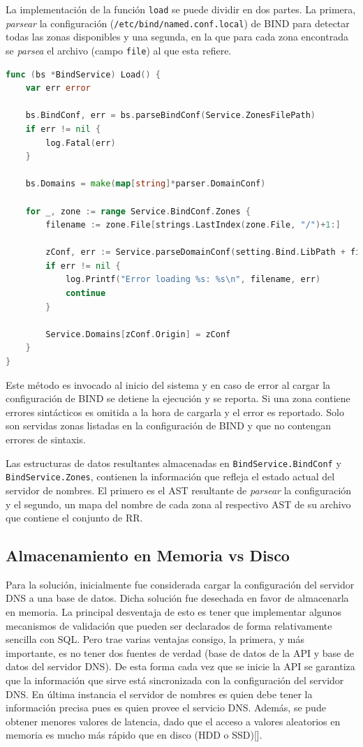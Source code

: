 La implementación de la función \verb|load| se puede dividir en dos partes. La primera, \textit{parsear} la configuración (\verb|/etc/bind/named.conf.local|) de BIND para detectar todas las zonas disponibles y una segunda, en la que para cada zona encontrada se \textit{parsea} el archivo (campo \verb|file|) al que esta refiere.

\begin{lstlisting}[frame=single, language=Go, caption=Implementación de la función \textbf{load} para BIND.]
func (bs *BindService) Load() {
	var err error

	bs.BindConf, err = bs.parseBindConf(Service.ZonesFilePath)
	if err != nil {
		log.Fatal(err)
	}

	bs.Domains = make(map[string]*parser.DomainConf)

	for _, zone := range Service.BindConf.Zones {
		filename := zone.File[strings.LastIndex(zone.File, "/")+1:]

		zConf, err := Service.parseDomainConf(setting.Bind.LibPath + filename)
		if err != nil {
			log.Printf("Error loading %s: %s\n", filename, err)
			continue
		}

		Service.Domains[zConf.Origin] = zConf
	}
}
\end{lstlisting}

Este método es invocado al inicio del sistema y en caso de error al cargar la configuración de BIND se detiene la ejecución y se reporta. Si una zona contiene errores sintácticos es omitida a la hora de cargarla y el error es reportado. Solo son servidas zonas listadas en la configuración de BIND y que no contengan errores de sintaxis.

Las estructuras de datos resultantes almacenadas en \verb|BindService.BindConf| y \verb|BindService.Zones|, contienen la información que refleja el estado actual del servidor de nombres. El primero es el AST resultante de \textit{parsear} la configuración y el segundo, un mapa del nombre de cada zona al respectivo AST de su archivo que contiene el conjunto de RR.

\subsection{Almacenamiento en Memoria vs Disco}

Para la solución, inicialmente fue considerada cargar la configuración del servidor DNS a una base de datos. Dicha solución fue desechada en favor de almacenarla en memoria. La principal desventaja de esto es tener que implementar algunos mecanismos de validación que pueden ser declarados de forma relativamente sencilla con SQL. Pero trae varias ventajas consigo, la primera, y más importante, es no tener dos fuentes de verdad (base de datos de la API y base de datos del servidor DNS). De esta forma cada vez que se inicie la API se garantiza que la información que sirve está sincronizada con la configuración del servidor DNS. En última instancia el servidor de nombres es quien debe tener la información precisa pues es quien provee el servicio DNS. Además, se pude obtener menores valores de latencia, dado que el acceso a valores aleatorios en memoria es mucho más rápido que en disco (HDD o SSD)[\cite{jacobs2009pathologies}].

